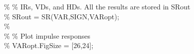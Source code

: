 \hspace{1mm}\hspace{5mm} \hspace{5mm} \hspace{5mm} \hspace{5mm} \hspace{5mm} \hspace{5mm} \hspace{5mm} \hspace{5mm} \textcolor{matlabgreen}{\% }\textcolor{matlabgreen}{\% IRs, VDs, and HDs. All the results are stored in SRout }\\ 
\hspace{1mm}\hspace{5mm} \hspace{5mm} \hspace{5mm} \hspace{5mm} \hspace{5mm} \hspace{5mm} \hspace{5mm} \hspace{5mm} \textcolor{matlabgreen}{\% SRout = SR(VAR,SIGN,VARopt); }\\ 
\hspace{1mm}\hspace{5mm} \hspace{5mm} \hspace{5mm} \hspace{5mm} \hspace{5mm} \hspace{5mm} \hspace{5mm} \hspace{5mm} \textcolor{matlabgreen}{\%  }\\ 
\hspace{1mm}\hspace{5mm} \hspace{5mm} \hspace{5mm} \hspace{5mm} \hspace{5mm} \hspace{5mm} \hspace{5mm} \hspace{5mm} \textcolor{matlabgreen}{\% }\textcolor{matlabgreen}{\% Plot impulse responses }\\ 
\hspace{1mm}\hspace{5mm} \hspace{5mm} \hspace{5mm} \hspace{5mm} \hspace{5mm} \hspace{5mm} \hspace{5mm} \hspace{5mm} \textcolor{matlabgreen}{\% VARopt.FigSize = [26,24]; }\\ 
